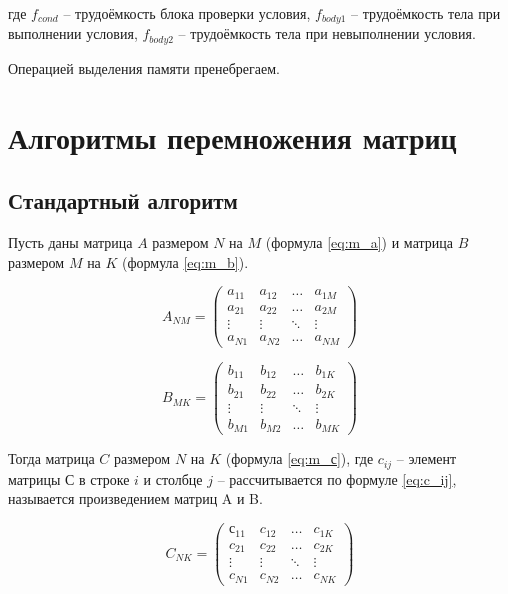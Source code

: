 где $f_{cond}$ -- трудоёмкость блока проверки условия, $ f_{body1}$ -- трудоёмкость тела при выполнении условия, $ f_{body2}$ -- трудоёмкость тела при невыполнении условия.

Операцией выделения памяти пренебрегаем.

\section{Алгоритмы перемножения матриц}

\subsection{Стандартный алгоритм}

Пусть даны матрица $A$ размером $N$ на $M$ (формула \ref{eq:m_a}) и матрица $B$ размером $M$ на $K$ (формула \ref{eq:m_b}).

\begin{equation}
	\label{eq:m_a}
	A_{NM} = \begin{pmatrix}
		a_{11} & a_{12} & \ldots & a_{1M} \\
		a_{21} & a_{22} & \ldots & a_{2M} \\
		\vdots & \vdots & \ddots & \vdots \\
		a_{N1} & a_{N2} & \ldots & a_{NM} 
	\end{pmatrix}
\end{equation}

\begin{equation}
	\label{eq:m_b}
	B_{MK} = \begin{pmatrix}
		b_{11} & b_{12} & \ldots & b_{1K} \\
		b_{21} & b_{22} & \ldots & b_{2K} \\
		\vdots & \vdots & \ddots & \vdots \\
		b_{M1} & b_{M2} & \ldots & b_{MK} 
	\end{pmatrix}
\end{equation}

Тогда матрица $C$ размером $N$ на $K$ (формула \ref{eq:m_с}), где $c_{ij}$ -- элемент матрицы $С$ в строке $i$ и столбце $j$ -- рассчитывается по формуле \ref{eq:c_ij}, называется произведением матриц A и B. 

\begin{equation}
	\label{eq:m_с}
	C_{NK} = \begin{pmatrix}
		с_{11} & c_{12} & \ldots & c_{1K} \\
		c_{21} & c_{22} & \ldots & c_{2K} \\
		\vdots & \vdots & \ddots & \vdots \\
		c_{N1} & c_{N2} & \ldots & c_{NK} 
	\end{pmatrix}
\end{equation}

